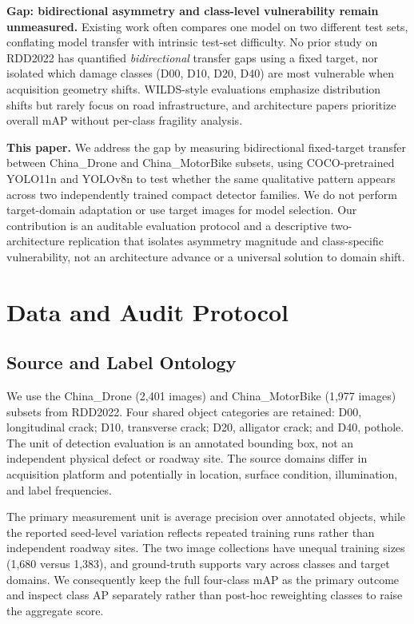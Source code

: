 \documentclass[conference,a4paper]{IEEEtran}
\begin{document}
\textbf{Gap: bidirectional asymmetry and class-level vulnerability remain unmeasured.} Existing work often compares one model on two different test sets, conflating model transfer with intrinsic test-set difficulty. No prior study on RDD2022 has quantified \emph{bidirectional} transfer gaps using a fixed target, nor isolated which damage classes (D00, D10, D20, D40) are most vulnerable when acquisition geometry shifts. WILDS-style evaluations emphasize distribution shifts but rarely focus on road infrastructure, and architecture papers prioritize overall mAP without per-class fragility analysis.

\textbf{This paper.} We address the gap by measuring bidirectional fixed-target transfer between China\_Drone and China\_MotorBike subsets, using COCO-pretrained YOLO11n \cite{jocher2024yolo11} and YOLOv8n \cite{ultralyticsyolov8} to test whether the same qualitative pattern appears across two independently trained compact detector families. We do not perform target-domain adaptation or use target images for model selection. Our contribution is an auditable evaluation protocol and a descriptive two-architecture replication that isolates asymmetry magnitude and class-specific vulnerability, not an architecture advance or a universal solution to domain shift.

\section{Data and Audit Protocol}
\subsection{Source and Label Ontology}
We use the China\_Drone (2,401 images) and China\_MotorBike (1,977 images) subsets from RDD2022. Four shared object categories are retained: D00, longitudinal crack; D10, transverse crack; D20, alligator crack; and D40, pothole. The unit of detection evaluation is an annotated bounding box, not an independent physical defect or roadway site. The source domains differ in acquisition platform and potentially in location, surface condition, illumination, and label frequencies.

The primary measurement unit is average precision over annotated objects, while the reported seed-level variation reflects repeated training runs rather than independent roadway sites. The two image collections have unequal training sizes (1,680 versus 1,383), and ground-truth supports vary across classes and target domains. We consequently keep the full four-class mAP as the primary outcome and inspect class AP separately rather than post-hoc reweighting classes to raise the aggregate score.
\end{document}
